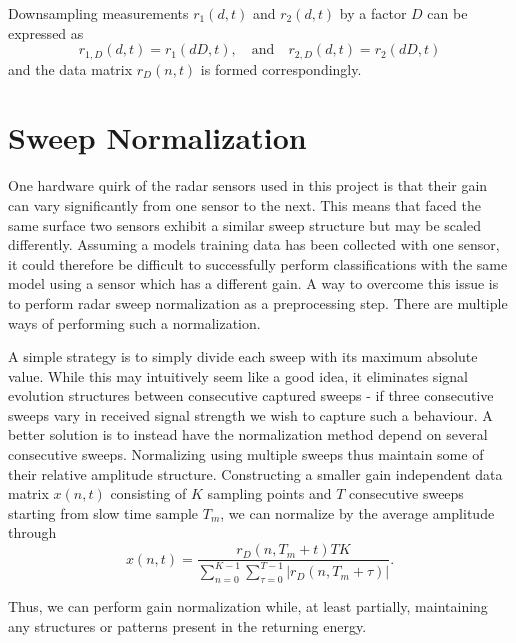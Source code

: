 Downsampling measurements $r_1(d,t)$ and $r_2(d,t)$ by a factor $D$ can be expressed as
\begin{equation}
\label{eq:downsamp}
	r_{1,D}(d, t) = r_{1}(dD,t), 
	\quad \text{and} \quad r_{2,D}(d,t) = r_{2}(dD,t)
\end{equation}
and the data matrix $r_D(n,t)$ is formed correspondingly.

\section{Sweep Normalization}\label{sec:norm}

One hardware quirk of the radar sensors used in this project is that their gain can vary significantly from one sensor to the next. This means that faced the same surface two sensors exhibit a similar sweep structure but may be scaled differently. Assuming a models training data has been collected with one sensor, it could therefore be difficult to successfully perform classifications with the same model using a sensor which has a different gain. A way to overcome this issue is to perform radar sweep normalization as a preprocessing step. There are multiple ways of performing such a normalization. %

A simple strategy is to simply divide each sweep with its maximum absolute value. While this may intuitively seem like a good idea, it eliminates signal evolution structures between consecutive captured sweeps - if three consecutive sweeps vary in received signal strength we wish to capture such a behaviour. A better solution is to instead have the normalization method depend on several consecutive sweeps. Normalizing using multiple sweeps thus maintain some of their relative amplitude structure. Constructing a smaller gain independent data matrix $x(n,t)$ consisting of $K$ sampling points and $T$ consecutive sweeps starting from slow time sample $T_m$, we can normalize by the average amplitude through
\begin{equation}
	x(n,t) = 
	\frac{r_D(n, T_m + t)TK}{\sum_{n=0}^{K-1}\sum_{\tau=0}^{T-1}|r_D(n, T_m+\tau)|}.
\end{equation}

Thus, we can perform gain normalization while, at least partially, maintaining any structures or patterns present in the returning energy. 

